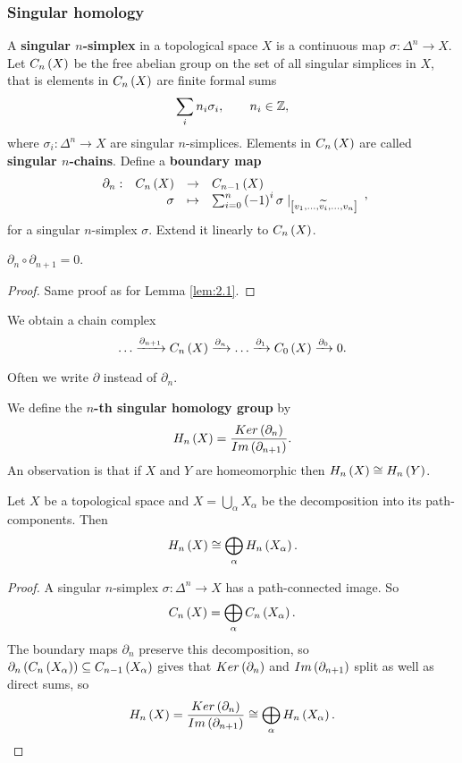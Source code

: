 \subsubsection{Singular homology}


A \textbf{singular $ n $-simplex} in a topological space $ X $ is a continuous map $ \sigma : \Delta^n \to X $. Let $ C_n\left( X \right) $ be the free abelian group on the set of all singular simplices in $ X $, that is elements in $ C_n\left( X \right) $ are finite formal sums
$$ \sum_i n_i \sigma_i, \qquad n_i \in \mathbb{Z}, $$
where $ \sigma_i : \Delta^n \to X $ are singular $ n $-simplices. Elements in $ C_n\left( X \right) $ are called \textbf{singular $ n $-chains}. Define a \textbf{boundary map}
$$ \function[\partial_n]{C_n\rb{X}}{C_{n - 1}\rb{X}}{\sigma}{\sum_{i = 0}^n \rb{-1}^i\sigma \mid_{\sb{v_1, \dots, \widetilde{v_i}, \dots, v_n}}}, $$
for a singular $ n $-simplex $ \sigma $. Extend it linearly to $ C_n\left( X \right) $.

\begin{lemma}
$ \partial_n \circ \partial_{n + 1} = 0 $.
\end{lemma}

\begin{proof}
Same proof as for Lemma \ref{lem:2.1}.
\end{proof}

We obtain a chain complex
$$ \dots \xrightarrow{\partial_{n + 1}} C_n\left( X \right) \xrightarrow{\partial_n} \dots \xrightarrow{\partial_1} C_0\left( X \right) \xrightarrow{\partial_0} 0. $$

\begin{remark*}
Often we write $ \partial $ instead of $ \partial_n $.
\end{remark*}

We define the \textbf{$ n $-th singular homology group} by
$$ H_n\left( X \right) = \dfrac{Ker\left( \partial_n \right)}{Im\left( \partial_{n + 1} \right)}. $$
An observation is that if $ X $ and $ Y $ are homeomorphic then $ H_n\left( X \right) \cong H_n\left( Y \right) $.

\begin{proposition}
\label{prop:2.6}
Let $ X $ be a topological space and $ X = \bigcup_\alpha X_\alpha $ be the decomposition into its path-components. Then
$$ H_n\left( X \right) \cong \bigoplus_\alpha H_n\left( X_\alpha \right). $$
\end{proposition}

\begin{proof}
A singular $ n $-simplex $ \sigma : \Delta^n \to X $ has a path-connected image. So
$$ C_n\left( X \right) = \bigoplus_\alpha C_n\left( X_\alpha \right). $$
The boundary maps $ \partial_n $ preserve this decomposition, so $ \partial_n\left( C_n\left( X_\alpha \right) \right) \subseteq C_{n - 1}\left( X_\alpha \right) $ gives that $ Ker\left( \partial_n \right) $ and $ Im\left( \partial_{n + 1} \right) $ split as well as direct sums, so
$$ H_n\left( X \right) = \dfrac{Ker\left( \partial_n \right)}{Im\left( \partial_{n + 1} \right)} \cong \bigoplus_\alpha H_n\left( X_\alpha \right). $$
\end{proof}

